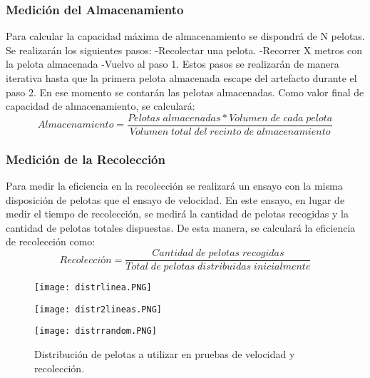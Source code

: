\subsubsection{Medición del Almacenamiento}
Para calcular la capacidad máxima de almacenamiento se dispondrá de N pelotas. Se realizarán los siguientes pasos:
-Recolectar una pelota.
-Recorrer X metros con la pelota almacenada
-Vuelvo al paso 1.
Estos pasos se realizarán de manera iterativa hasta que la primera pelota almacenada escape del artefacto durante el paso 2. En ese momento se contarán las pelotas almacenadas. Como valor final de capacidad de almacenamiento, se calculará:
\vspace{3mm}
\begin{equation}
  Almacenamiento =\frac{Pelotas\;almacenadas*Volumen\;de\;cada\;pelota}{Volumen\;total\;del\;recinto\;de\;almacenamiento}
\end{equation}
\vspace{5mm}

\subsubsection{Medición de la Recolección}
Para medir la eficiencia en la recolección se realizará un ensayo con la misma disposición de pelotas que el ensayo de velocidad. En este ensayo, en lugar de medir el tiempo de recolección, se medirá la cantidad de pelotas recogidas y la cantidad de pelotas totales dispuestas. De esta manera, se calculará la eficiencia de recolección como:
\vspace{3mm}
\begin{equation}
  Recolección=\frac{Cantidad\;de\;pelotas\;recogidas}{Total\;de\;pelotas\;distribuidas\;inicialmente}
\end{equation}

\begin{figure}[H]
\centering
\begin{minipage}{.33\textwidth}
  \centering
  \texttt{[image: distrlinea.PNG]}
  \label{fig:distr-lineal}
\end{minipage}%
\hfill
\begin{minipage}{.33\textwidth}
  \centering
  \texttt{[image: distr2lineas.PNG]}
  \label{fig:distr-bilineal}
\end{minipage}%
\hfill
\begin{minipage}{.33\textwidth}
  \centering
  \texttt{[image: distrrandom.PNG]}
  \label{fig:distr-random}
\end{minipage}
\caption{Distribución de pelotas a utilizar en pruebas de velocidad y recolección.}
\label{fig:distr}
\end{figure}
